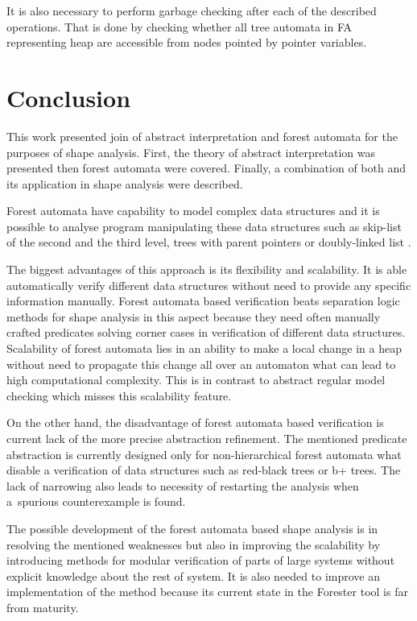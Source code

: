 \documentclass[a4paper, 12pt]{article}
\begin{document}
It is also necessary to perform garbage checking after each of the described operations.
That is done by checking whether all tree automata in FA representing heap are accessible
from nodes pointed by pointer variables.

\section{Conclusion}

This work presented join of abstract interpretation and forest automata
for the purposes of shape analysis.
First, the theory of abstract interpretation was presented
then forest automata were covered.
Finally, a combination of both and its application
in shape analysis were described.

Forest automata have capability to model complex data structures
and it is possible to analyse program manipulating these data structures
such as skip-list of the second and the third level, trees with parent pointers
or doubly-linked list \cite{svcomp15}.

The biggest advantages of this approach is its flexibility and scalability.
It is able automatically verify different data structures without need to
provide any specific information manually.
Forest automata based verification beats separation logic methods for shape analysis
in this aspect because they need often manually crafted predicates
solving corner cases in verification of different data structures.
Scalability of forest automata lies in an ability to make a local
change in a heap without need to propagate this change all over
an automaton what can lead to high computational complexity.
This is in contrast to abstract regular model checking which
misses this scalability feature.

On the other hand, the disadvantage of forest automata based verification
is current lack of the more precise abstraction refinement.
The mentioned predicate abstraction is currently designed only for
non-hierarchical forest automata what disable a verification of
data structures such as red-black trees or b+ trees.
The lack of narrowing also leads to necessity of restarting
the analysis when a~spurious counterexample is found.

The possible development of the forest automata based shape analysis
is in resolving the mentioned weaknesses but also in improving
the scalability by introducing methods for modular verification
of parts of large systems without explicit knowledge about the rest of system.
It is also needed to improve an implementation of the method because
its current state in the Forester tool is far from maturity.

\newpage


\end{document}
